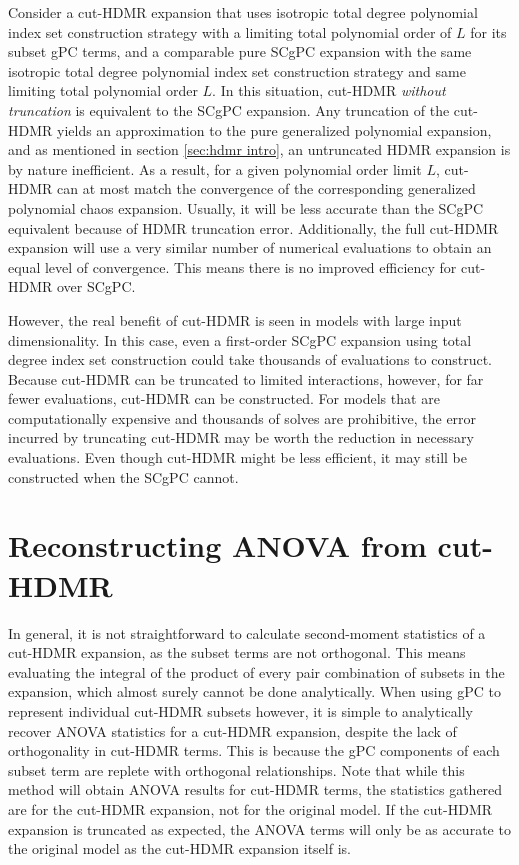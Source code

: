 Consider a cut-HDMR expansion that uses isotropic total degree polynomial index set construction strategy with
a limiting total polynomial order of $L$ for its subset gPC terms, and a comparable pure 
SCgPC expansion with the same isotropic total degree polynomial index set construction strategy and same
limiting total polynomial order $L$.  In this situation, cut-HDMR \emph{without truncation} is equivalent to
the SCgPC expansion.  Any truncation of the cut-HDMR yields an approximation to
the pure generalized polynomial expansion, and as mentioned in section \ref{sec:hdmr intro}, an untruncated
HDMR expansion is by nature
inefficient.  As a result, for a given polynomial order limit $L$, cut-HDMR can at
most match the convergence of the corresponding generalized polynomial chaos expansion.  Usually, it will be
less accurate than the SCgPC equivalent because of HDMR truncation error.  Additionally, the
full cut-HDMR expansion will use a very similar number of numerical evaluations to obtain an equal level of
convergence.  This means there is no improved efficiency for cut-HDMR over SCgPC.

However, the real benefit of cut-HDMR is seen in models with large input dimensionality.  In this case, even a
first-order SCgPC expansion using total degree index set construction could take
thousands of evaluations to construct.  Because cut-HDMR can be truncated to limited interactions, however,
for far fewer evaluations, cut-HDMR can be constructed.  For models that are computationally expensive and
thousands of solves are
prohibitive, the error incurred by truncating cut-HDMR may be worth the reduction in necessary evaluations.
Even though cut-HDMR might be less efficient, it may still be constructed when the SCgPC cannot.

\section{Reconstructing ANOVA from cut-HDMR}\label{sec:cut anova}
In general, it is not straightforward to calculate second-moment statistics of a cut-HDMR expansion, as the
subset terms are not orthogonal.  This means evaluating the integral of the product of every pair combination
of subsets in the expansion, which almost surely cannot be done analytically.
When using gPC to represent individual cut-HDMR subsets however, it is simple to analytically recover ANOVA statistics 
for a
cut-HDMR expansion, despite the lack of orthogonality in cut-HDMR terms.  This is because the gPC components
of each subset term are replete with orthogonal relationships.  Note that while this method will
obtain ANOVA results for cut-HDMR terms, the statistics gathered are for the cut-HDMR expansion, not for the
original model.  If the cut-HDMR expansion is truncated as expected, the ANOVA terms will only be as accurate
to the original model as the cut-HDMR expansion itself is.  

